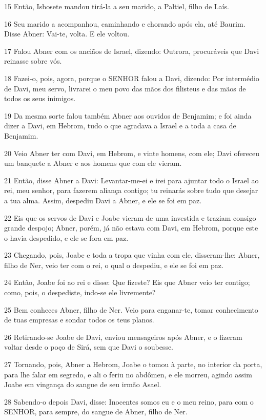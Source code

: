 \par 15 Então, Isbosete mandou tirá-la a seu marido, a Paltiel, filho de Laís.
\par 16 Seu marido a acompanhou, caminhando e chorando após ela, até Baurim. Disse Abner: Vai-te, volta. E ele voltou.
\par 17 Falou Abner com os anciãos de Israel, dizendo: Outrora, procuráveis que Davi reinasse sobre vós.
\par 18 Fazei-o, pois, agora, porque o SENHOR falou a Davi, dizendo: Por intermédio de Davi, meu servo, livrarei o meu povo das mãos dos filisteus e das mãos de todos os seus inimigos.
\par 19 Da mesma sorte falou também Abner aos ouvidos de Benjamim; e foi ainda dizer a Davi, em Hebrom, tudo o que agradava a Israel e a toda a casa de Benjamim.
\par 20 Veio Abner ter com Davi, em Hebrom, e vinte homens, com ele; Davi ofereceu um banquete a Abner e aos homens que com ele vieram.
\par 21 Então, disse Abner a Davi: Levantar-me-ei e irei para ajuntar todo o Israel ao rei, meu senhor, para fazerem aliança contigo; tu reinarás sobre tudo que desejar a tua alma. Assim, despediu Davi a Abner, e ele se foi em paz.
\par 22 Eis que os servos de Davi e Joabe vieram de uma investida e traziam consigo grande despojo; Abner, porém, já não estava com Davi, em Hebrom, porque este o havia despedido, e ele se fora em paz.
\par 23 Chegando, pois, Joabe e toda a tropa que vinha com ele, disseram-lhe: Abner, filho de Ner, veio ter com o rei, o qual o despediu, e ele se foi em paz.
\par 24 Então, Joabe foi ao rei e disse: Que fizeste? Eis que Abner veio ter contigo; como, pois, o despediste, indo-se ele livremente?
\par 25 Bem conheces Abner, filho de Ner. Veio para enganar-te, tomar conhecimento de tuas empresas e sondar todos os teus planos.
\par 26 Retirando-se Joabe de Davi, enviou mensageiros após Abner, e o fizeram voltar desde o poço de Sirá, sem que Davi o soubesse.
\par 27 Tornando, pois, Abner a Hebrom, Joabe o tomou à parte, no interior da porta, para lhe falar em segredo, e ali o feriu no abdômen, e ele morreu, agindo assim Joabe em vingança do sangue de seu irmão Asael.
\par 28 Sabendo-o depois Davi, disse: Inocentes somos eu e o meu reino, para com o SENHOR, para sempre, do sangue de Abner, filho de Ner.
